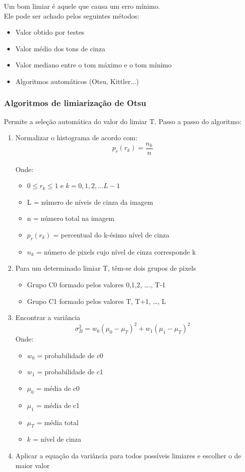 \documentclass{article}
\begin{document}
Um bom limiar é aquele que causa um erro mínimo. \\ Ele pode ser achado pelos seguintes métodos:

\begin{itemize}
    \item Valor obtido por testes 
    \item Valor médio dos tons de cinza 
    \item Valor mediano entre o tom máximo e o tom mínimo 
    \item Algoritmos automáticos (Otsu, Kittler...)
\end{itemize}

\subsubsection{Algoritmos de limiarização de Otsu}
Permite a seleção automática do valor do limiar T.
Passo a passo do algoritmo:
\begin{enumerate}
    \item  Normalizar o histograma de acordo com: 
    $$p_{r}(r_{k})=\frac{n_{k}}{n}$$ \\
    Onde:
    \begin{itemize}
        \item $0 \le r_{k} \le 1 \mbox{ e } k = 0,1,2, \ldots L-1$
        \item L = número de níveis de cinza da imagem 
        \item n = número total na imagem
        \item $p_{r}(r_{k})$ = percentual do k-ésimo nível de cinza
        \item $n_{k}$ = número de pixels cujo nível de cinza corresponde k 
    \end{itemize}
    \item  Para um determinado limiar T, têm-se dois grupos de pixels
    \begin{itemize}
        \item Grupo C0 formado pelos valores {0,1,2, …., T-1} 
        \item Grupo C1 formado pelos valores {T, T+1, …, L}
    \end{itemize}
    \item Encontrar a variância 
    $$\sigma_{B}^2=w_{0}(\mu_{0}-\mu_{T})^2+w_{1}(\mu_{1}-\mu_{T})^2$$
    Onde:
    \begin{itemize}
        \item $w_{0}$ = probabilidade de c0 
        \item $w_{1}$ = probabilidade de c1 
        \item $\mu_{0}$ = média de c0
        \item $\mu_{1}$ = média de c1
        \item $\mu_{T}$ = média total
        \item $k$ = nível de cinza
    \end{itemize}
    \item Aplicar a equação da variância para todos possíveis limiares e escolher o de maior valor
\end{enumerate}
\end{document}
